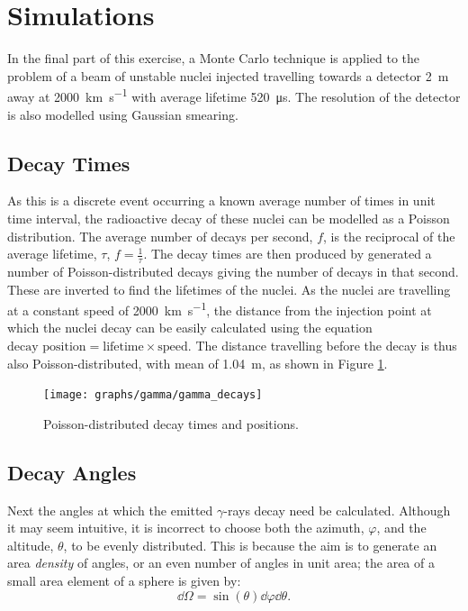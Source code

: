 \section{Simulations}
\label{sec:gamma}

In the final part of this exercise, a Monte Carlo technique is applied to the problem of a beam of unstable nuclei injected travelling towards a detector \SI{2}{\meter} away at \SI{2000}{\kilo\meter\per\second} with average lifetime \SI{520}{\micro\second}. The resolution of the detector is also modelled using Gaussian smearing.

\subsection{Decay Times}
\label{subsec:decay_times}

As this is a discrete event occurring a known average number of times in unit time interval, the radioactive decay of these nuclei can be modelled as a Poisson distribution. The average number of decays per second, $f$, is the reciprocal of the average lifetime, $\tau$, $f = \frac{1}{\tau}$. The decay times are then produced by generated a number of Poisson-distributed decays giving the number of decays in that second. These are inverted to find the lifetimes of the nuclei. As the nuclei are travelling at a constant speed of \SI{2000}{\kilo\meter\per\second}, the distance from the injection point at which the nuclei decay can be easily calculated using the equation $\text{decay position} = \text{lifetime} \times \text{speed}$. The distance travelling before the decay is thus also Poisson-distributed, with mean of \SI{1.04}{\meter}, as shown in Figure \ref{fig:decays}.

\begin{figure}
    \centering
    \texttt{[image: graphs/gamma/gamma\_decays]}
    \caption{Poisson-distributed decay times and positions.}
    \label{fig:decays}
\end{figure}

\subsection{Decay Angles}
\label{susbec:decay_angles}

Next the angles at which the emitted $\gamma$-rays decay need be calculated. Although it may seem intuitive, it is incorrect to choose both the azimuth, $\varphi$, and the altitude, $\theta$, to be evenly distributed. This is because the aim is to generate an area \textit{density} of angles, or an even number of angles in unit area; the area of a small area element of a sphere is given by\cite{WolframPointPicking}:
\begin{equation}
    \dd \Omega = \sin(\theta) \dd \varphi \dd \theta.
    \label{eqn:spherical_area_element}
\end{equation}

